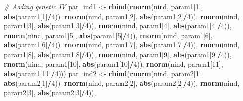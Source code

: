 \documentclass[
]{article}
\newenvironment{Shaded}{\begin{snugshade}}{\end{snugshade}}
\newcommand{\CommentTok}[1]{\textcolor[rgb]{0.56,0.35,0.01}{\textit{#1}}}
\newcommand{\DecValTok}[1]{\textcolor[rgb]{0.00,0.00,0.81}{#1}}
\newcommand{\KeywordTok}[1]{\textcolor[rgb]{0.13,0.29,0.53}{\textbf{#1}}}
\newcommand{\NormalTok}[1]{#1}
\newcommand{\OperatorTok}[1]{\textcolor[rgb]{0.81,0.36,0.00}{\textbf{#1}}}
\newcommand{\StringTok}[1]{\textcolor[rgb]{0.31,0.60,0.02}{#1}}
\begin{document}
\begin{Shaded}
\begin{Highlighting}[]
\CommentTok{# Adding genetic IV}
\NormalTok{par_ind1 <-}\StringTok{ }\KeywordTok{rbind}\NormalTok{(}\KeywordTok{rnorm}\NormalTok{(nind, param1[}\DecValTok{1}\NormalTok{], }\KeywordTok{abs}\NormalTok{(param1[}\DecValTok{1}\NormalTok{]}\OperatorTok{/}\DecValTok{4}\NormalTok{)), }\KeywordTok{rnorm}\NormalTok{(nind, }
\NormalTok{    param1[}\DecValTok{2}\NormalTok{], }\KeywordTok{abs}\NormalTok{(param1[}\DecValTok{2}\NormalTok{]}\OperatorTok{/}\DecValTok{4}\NormalTok{)), }\KeywordTok{rnorm}\NormalTok{(nind, param1[}\DecValTok{3}\NormalTok{], }\KeywordTok{abs}\NormalTok{(param1[}\DecValTok{3}\NormalTok{]}\OperatorTok{/}\DecValTok{4}\NormalTok{)), }
    \KeywordTok{rnorm}\NormalTok{(nind, param1[}\DecValTok{4}\NormalTok{], }\KeywordTok{abs}\NormalTok{(param1[}\DecValTok{4}\NormalTok{]}\OperatorTok{/}\DecValTok{4}\NormalTok{)), }\KeywordTok{rnorm}\NormalTok{(nind, param1[}\DecValTok{5}\NormalTok{], }
        \KeywordTok{abs}\NormalTok{(param1[}\DecValTok{5}\NormalTok{]}\OperatorTok{/}\DecValTok{4}\NormalTok{)), }\KeywordTok{rnorm}\NormalTok{(nind, param1[}\DecValTok{6}\NormalTok{], }\KeywordTok{abs}\NormalTok{(param1[}\DecValTok{6}\NormalTok{]}\OperatorTok{/}\DecValTok{4}\NormalTok{)), }
    \KeywordTok{rnorm}\NormalTok{(nind, param1[}\DecValTok{7}\NormalTok{], }\KeywordTok{abs}\NormalTok{(param1[}\DecValTok{7}\NormalTok{]}\OperatorTok{/}\DecValTok{4}\NormalTok{)), }\KeywordTok{rnorm}\NormalTok{(nind, param1[}\DecValTok{8}\NormalTok{], }
        \KeywordTok{abs}\NormalTok{(param1[}\DecValTok{8}\NormalTok{]}\OperatorTok{/}\DecValTok{4}\NormalTok{)), }\KeywordTok{rnorm}\NormalTok{(nind, param1[}\DecValTok{9}\NormalTok{], }\KeywordTok{abs}\NormalTok{(param1[}\DecValTok{9}\NormalTok{]}\OperatorTok{/}\DecValTok{4}\NormalTok{)), }
    \KeywordTok{rnorm}\NormalTok{(nind, param1[}\DecValTok{10}\NormalTok{], }\KeywordTok{abs}\NormalTok{(param1[}\DecValTok{10}\NormalTok{]}\OperatorTok{/}\DecValTok{4}\NormalTok{)), }\KeywordTok{rnorm}\NormalTok{(nind, param1[}\DecValTok{11}\NormalTok{], }
        \KeywordTok{abs}\NormalTok{(param1[}\DecValTok{11}\NormalTok{]}\OperatorTok{/}\DecValTok{4}\NormalTok{)))}
\NormalTok{par_ind2 <-}\StringTok{ }\KeywordTok{rbind}\NormalTok{(}\KeywordTok{rnorm}\NormalTok{(nind, param2[}\DecValTok{1}\NormalTok{], }\KeywordTok{abs}\NormalTok{(param2[}\DecValTok{1}\NormalTok{]}\OperatorTok{/}\DecValTok{4}\NormalTok{)), }\KeywordTok{rnorm}\NormalTok{(nind, }
\NormalTok{    param2[}\DecValTok{2}\NormalTok{], }\KeywordTok{abs}\NormalTok{(param2[}\DecValTok{2}\NormalTok{]}\OperatorTok{/}\DecValTok{4}\NormalTok{)), }\KeywordTok{rnorm}\NormalTok{(nind, param2[}\DecValTok{3}\NormalTok{], }\KeywordTok{abs}\NormalTok{(param2[}\DecValTok{3}\NormalTok{]}\OperatorTok{/}\DecValTok{4}\NormalTok{)), }

\end{Highlighting}
\end{Shaded}
\end{document}
